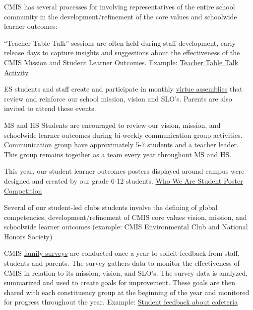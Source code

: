 \begin{findings}
CMIS has several processes for involving representatives of the entire school community in the development/refinement of the core values and schoolwide learner outcomes:

“Teacher Table Talk” sessions are often held during staff development, early release days to capture insights and suggestions about the effectiveness of the CMIS Mission and Student Learner Outcomes.  Example: \href{https://drive.google.com/a/cmis.ac.th/file/d/0ByVFfrm0zfolbHNvSWhVWmJYU3M/view?usp=sharing}{Teacher Table Talk Activity} 

ES students and staff create and participate in monthly \href{https://docs.google.com/a/cmis.ac.th/document/d/1Mv1xjTpbY36naur8SDt9GanKNfR7YtYVL-bWwGLPSHo/edit?usp=sharing}{virtue assemblies} that review and reinforce our school mission, vision and SLO’s. Parents are also invited to attend these events.

MS and HS Students are encouraged to review our vision, mission, and schoolwide learner outcomes during bi-weekly communication group activities. Communication group have approximately 5-7 students and a teacher leader. This group remains together as a team every year throughout MS and HS.
 
This year, our student learner outcomes posters displayed around campus were designed and created by our grade 6-12 students. \href{https://docs.google.com/a/cmis.ac.th/document/d/1x29XpA7Ro2Xav3JFY0k9F2O22qZi4Yo48hVTYkvhoGM/edit?usp=sharing}{Who We Are Student Poster Competition}

Several of our student-led clubs students involve the defining of global competencies, development/refinement of CMIS core values vision, mission, and schoolwide learner outcomes  (example: CMIS Environmental Club and National Honors Society)

CMIS \href{https://docs.google.com/a/cmis.ac.th/forms/d/16Gbd3MzQOXtjjZ2dG460xw5SHG_eohMIKet3lxYUdAY/prefill}{family surveys} are conducted once a year to solicit feedback from staff, students and parents. The survey gathers data to monitor the effectiveness of CMIS in relation to its mission, vision, and SLO’s. The survey data is analyzed, summarized and used to create goals for improvement. These goals are then shared with each constituency group at the beginning of the year and monitored for progress throughout the year. Example: \href{https://docs.google.com/a/cmis.ac.th/document/d/10w_OSr00xntX42ShaPk4PiNu9FjKP2OgA3g6CKjmEFc/edit?usp=sharing}{Student feedback about cafeteria}


\end{findings}
